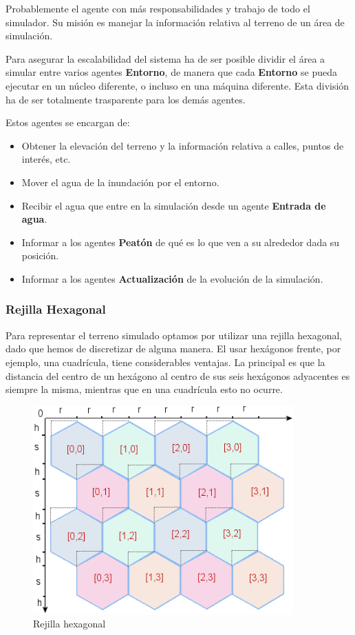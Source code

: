 Probablemente el agente con más responsabilidades y trabajo de todo el
simulador. Su misión es manejar la información relativa al terreno de un área
de simulación.

Para asegurar la escalabilidad del sistema ha de ser posible dividir el área a
simular entre varios agentes {\bf Entorno}, de manera que cada {\bf Entorno} se
pueda ejecutar en un núcleo diferente, o incluso en una máquina diferente. Esta
división ha de ser totalmente trasparente para los demás agentes.

Estos agentes se encargan de:

\begin{itemize}
 \item Obtener la elevación del terreno y la información relativa a calles,
puntos de interés, etc.
 \item Mover el agua de la inundación por el entorno.
 \item Recibir el agua que entre en la simulación desde un agente {\bf Entrada
de agua}.
 \item Informar a los agentes {\bf Peatón} de qué es lo que ven a su alrededor
dada su posición.
 \item Informar a los agentes {\bf Actualización} de la evolución de la
simulación.
\end{itemize}

\subsubsection*{Rejilla Hexagonal}

Para representar el terreno simulado optamos por utilizar una rejilla
hexagonal, dado que hemos de discretizar de alguna manera. El usar hexágonos
frente, por ejemplo, una cuadrícula, tiene considerables ventajas. La principal
es que la distancia del centro de un hexágono al centro de sus seis hexágonos
adyacentes es siempre la misma, mientras que en una cuadrícula esto no ocurre.

\begin{figure}[H]
 \centering
 \includegraphics[width=100mm]{figuras/cap3/hexgrid.png}
 \caption{Rejilla hexagonal}
\end{figure}


